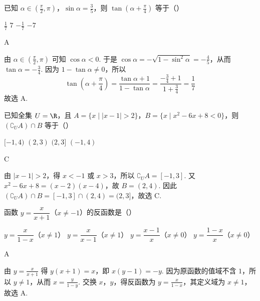 \begin{problem}
已知 \(\alpha \in \left(\frac{\pi}{2}, \pi\right)\)，\(\sin \alpha = \frac{3}{5}\)，则 \(\tan \left(\alpha + \frac{\pi}{4}\right)\) 等于（\quad）

\choices
    {\(\frac{1}{7}\)}
    {\(7\)}
    {\(-\frac{1}{7}\)}
    {\(-7\)}
\end{problem}

\begin{answer}
A
\end{answer}

\begin{solution}
由 \(\alpha\in\left(\frac{\pi}{2},\pi\right)\) 可知 \(\cos\alpha<0\). 于是
\(\cos\alpha=-\sqrt{1-\sin^2\alpha}=-\frac{4}{5}\)，从而 \(\tan\alpha=-\frac{3}{4}\). 因为 \(1-\tan\alpha\neq0\)，所以
\[
\tan\left(\alpha+\frac{\pi}{4}\right)=\frac{\tan\alpha+1}{1-\tan\alpha}=\frac{-\frac{3}{4}+1}{1+\frac{3}{4}}=\frac{1}{7}
\]
故选 A.
\end{solution}

\begin{problem}
已知全集 \(U = \R\)，且 \(A = \{x \mid |x - 1| > 2\}\)，\(B = \{x \mid x^2 - 6x + 8 < 0\}\)，则 \((\complement_U A) \cap B\) 等于（\quad）

\choices
    {\([-1,4)\)}
    {\((2,3)\)}
    {\((2,3]\)}
    {\((-1,4)\)}
\end{problem}

\begin{answer}
C
\end{answer}

\begin{solution}
由 \(|x-1|>2\)，得 \(x<-1\) 或 \(x>3\)，所以 \(\complement_U A=[-1,3]\). 又
\(x^2-6x+8=(x-2)(x-4)\)，故 \(B=(2,4)\). 因此
\((\complement_U A)\cap B=[-1,3]\cap(2,4)=(2,3]\)，故选 C.
\end{solution}

\begin{problem}
函数 \(y = \dfrac{x}{x + 1}\)（\(x \neq -1\)）的反函数是（\quad）

\choices
    {\(y = \dfrac{x}{1 - x}\)（\(x \neq 1\)）}
    {\(y = \dfrac{x}{x - 1}\)（\(x \neq 1\)）}
    {\(y = \dfrac{x - 1}{x}\)（\(x \neq 0\)）}
    {\(y = \dfrac{1 - x}{x}\)（\(x \neq 0\)）}
\end{problem}

\begin{answer}
A
\end{answer}

\begin{solution}
由 \(y=\frac{x}{x+1}\) 得 \(y(x+1)=x\)，即 \(x(y-1)=-y\). 因为原函数的值域不含 \(1\)，所以 \(y\neq1\)，从而
\(x=\frac{y}{1-y}\). 交换 \(x\)，\(y\)，得反函数为 \(y=\frac{x}{1-x}\)，其定义域为 \(x\neq1\)，故选 A.
\end{solution}

